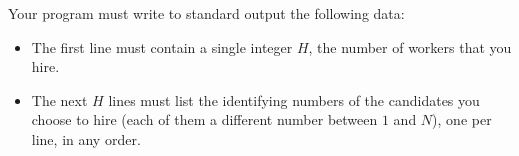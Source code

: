 Your program must write to standard output the following data:
\begin{itemize}
\item The first line must contain a single integer $H$, the number of workers that you hire.
\item The next $H$ lines must list the identifying numbers of the candidates you choose to hire (each of them a different number between $1$ and $N$), one per line, in any order.
\end{itemize}
